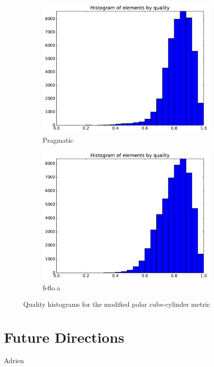 \documentclass[3p,times,procedia,number]{elsarticle}
\begin{document}
\begin{figure}
\begin{subfigure}{.16\textwidth}
\includegraphics[width=\textwidth]{pragmatic-cube-cylinder-polar-2-quality.pdf}
\caption{Pragmatic}
\end{subfigure}
\begin{subfigure}{.16\textwidth}
\centering
\includegraphics[width=\textwidth]{fefloa-cube-cylinder-polar-2-quality.pdf}
\caption{feflo.a}
\end{subfigure}
\caption{Quality histograms for the modified polar cube-cylinder metric}
\label{fig:cube-cylinder-polar-2-qualities}
\end{figure}

\section{Future Directions}
{\color{red} Adrien}
\end{document}
